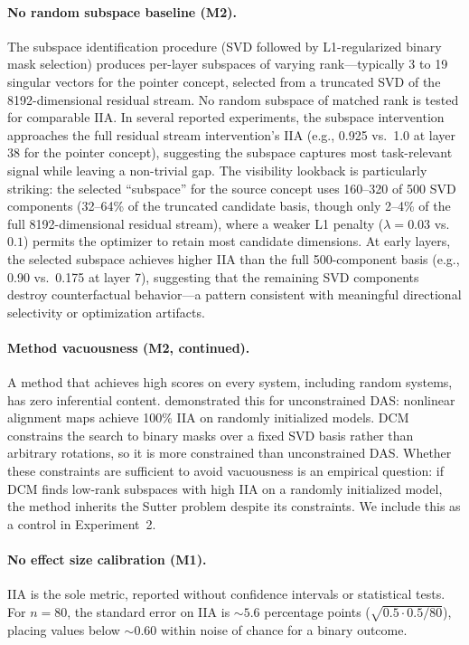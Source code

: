 \documentclass[11pt]{article}
\begin{document}
\paragraph{No random subspace baseline (M2).}
The subspace identification procedure (SVD followed by L1-regularized binary mask selection) produces per-layer subspaces of varying rank---typically 3 to 19 singular vectors for the pointer concept, selected from a truncated SVD of the 8192-dimensional residual stream. No random subspace of matched rank is tested for comparable IIA. In several reported experiments, the subspace intervention approaches the full residual stream intervention's IIA (e.g., 0.925 vs.\ 1.0 at layer 38 for the pointer concept), suggesting the subspace captures most task-relevant signal while leaving a non-trivial gap. The visibility lookback is particularly striking: the selected ``subspace'' for the source concept uses 160--320 of 500 SVD components (32--64\% of the truncated candidate basis, though only 2--4\% of the full 8192-dimensional residual stream), where a weaker L1 penalty ($\lambda = 0.03$ vs.\ $0.1$) permits the optimizer to retain most candidate dimensions. At early layers, the selected subspace achieves higher IIA than the full 500-component basis (e.g., 0.90 vs.\ 0.175 at layer 7), suggesting that the remaining SVD components destroy counterfactual behavior---a pattern consistent with meaningful directional selectivity or optimization artifacts.

\paragraph{Method vacuousness (M2, continued).}
A method that achieves high scores on every system, including random systems, has zero inferential content. \citet{sutter2025vacuous} demonstrated this for unconstrained DAS: nonlinear alignment maps achieve 100\% IIA on randomly initialized models. DCM constrains the search to binary masks over a fixed SVD basis rather than arbitrary rotations, so it is more constrained than unconstrained DAS. Whether these constraints are sufficient to avoid vacuousness is an empirical question: if DCM finds low-rank subspaces with high IIA on a randomly initialized model, the method inherits the Sutter problem despite its constraints. We include this as a control in Experiment~2.

\paragraph{No effect size calibration (M1).}
IIA is the sole metric, reported without confidence intervals or statistical tests. For $n = 80$, the standard error on IIA is ${\sim}5.6$ percentage points ($\sqrt{0.5 \cdot 0.5 / 80}$), placing values below ${\sim}0.60$ within noise of chance for a binary outcome.
\end{document}
